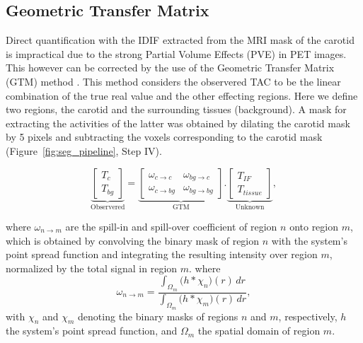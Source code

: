 \subsection{Geometric Transfer Matrix}
Direct quantification with the IDIF extracted from the MRI mask of the carotid is impractical due to the strong Partial Volume Effects (PVE) in PET images. %
This however can be corrected by the use of the Geometric Transfer Matrix (GTM) method \cite{rousset1998correction}.
This method considers the observered TAC to be the linear combination of the true real value and the other effecting regions.
Here we define two regions, the carotid and the surrounding tissues (background).
A mask for extracting the activities of the latter was obtained by dilating the carotid mask by 5 pixels and subtracting the voxels corresponding to the carotid mask (Figure~\ref{fig:seg_pipeline}, Step IV).

\begin{equation}
	\underbrace{
		\begin{bmatrix}
			T_{c} \\
			T_{bg}
		\end{bmatrix}
	}_{\text{Observered}}
	=
	\underbrace{
		\begin{bmatrix}
			\omega_{c \rightarrow c}  & \omega_{bg \rightarrow c}  \\
			\omega_{c \rightarrow bg} & \omega_{bg \rightarrow bg}
		\end{bmatrix}
	}_{\text{GTM}}
	.
	\underbrace{
		\begin{bmatrix}
			T_{IF} \\
			T_{tissue}
		\end{bmatrix}
	}_{\text{Unknown}},
\end{equation}

where $\omega_{n \rightarrow m}$ are the spill-in and spill-over coefficient of region $n$ onto region $m$, which is obtained by convolving the binary mask of region $n$ with the system's point spread function and integrating the resulting intensity over region $m$, normalized by the total signal in region $m$.
where
\begin{equation}
	\omega_{n\to m} = \frac{\displaystyle \int_{\Omega_m} \bigl( h \ast \chi_n \bigr)(r)\,dr}{\displaystyle \int_{\Omega_m} \bigl( h \ast \chi_m \bigr)(r)\,dr},
\end{equation}
with \(\chi_n\) and \(\chi_m\) denoting the binary masks of regions \(n\) and \(m\), respectively, \(h\) the system's point spread function, and \(\Omega_m\) the spatial domain of region \(m\).

